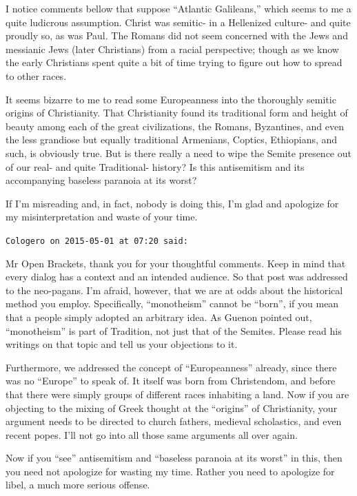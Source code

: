 \begin{footnotesize}
\begin{sffamily}
I notice comments bellow that suppose ``Atlantic Galileans,'' which seems to me a quite ludicrous assumption. Christ was semitic- in a Hellenized culture- and quite proudly so, as was Paul. The Romans did not seem concerned with the Jews and messianic Jews (later Christians) from a racial perspective; though as we know the early Christians spent quite a bit of time trying to figure out how to spread to other races.

It seems bizarre to me to read some Europeanness into the thoroughly semitic origins of Christianity. That Christianity found its traditional form and height of beauty among each of the great civilizations, the Romans, Byzantines, and even the less grandiose but equally traditional Armenians, Coptics, Ethiopians, and such, is obviously true. But is there really a need to wipe the Semite presence out of our real- and quite Traditional- history? Is this antisemitism and its accompanying baseless paranoia at its worst?

If I'm misreading and, in fact, nobody is doing this, I'm glad and apologize for my misinterpretation and waste of your time.

\hfill

\texttt{Cologero on 2015-05-01 at 07:20 said:}

Mr Open Brackets, thank you for your thoughtful comments. Keep in mind that every dialog has a context and an intended audience. So that post was addressed to the neo-pagans. I'm afraid, however, that we are at odds about the historical method you employ. Specifically, ``monotheism'' cannot be ``born'', if you mean that a people simply adopted an arbitrary idea. As Guenon pointed out, ``monotheism'' is part of Tradition, not just that of the Semites. Please read his writings on that topic and tell us your objections to it.

Furthermore, we addressed the concept of ``Europeanness'' already, since there was no ``Europe'' to speak of. It itself was born from Christendom, and before that there were simply groups of different races inhabiting a land. Now if you are objecting to the mixing of Greek thought at the ``origins'' of Christianity, your argument needs to be directed to church fathers, medieval scholastics, and even recent popes. I'll not go into all those same arguments all over again.

Now if you ``see'' antisemitism and ``baseless paranoia at its worst'' in this, then you need not apologize for wasting my time. Rather you need to apologize for libel, a much more serious offense.


\end{sffamily}
\end{footnotesize}
